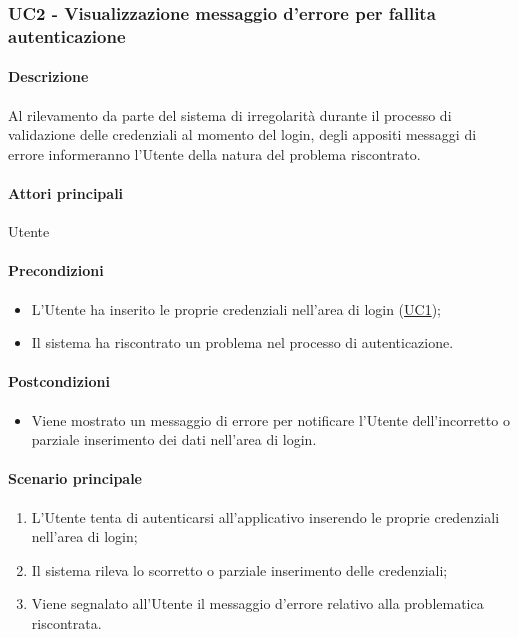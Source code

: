 \subsubsection{UC2 - Visualizzazione messaggio d'errore per fallita autenticazione}\label{UC2}
\paragraph*{Descrizione}
Al rilevamento da parte del sistema di irregolarità durante il processo di validazione delle credenziali al momento del login, degli appositi messaggi di errore informeranno l’Utente della natura del problema riscontrato.

\paragraph*{Attori principali}
Utente

\paragraph*{Precondizioni}
\begin{itemize}
  \item L’Utente ha inserito le proprie credenziali nell’area di login (\hyperref[UC1]{UC1});
  \item Il sistema ha riscontrato un problema nel processo di autenticazione.  
\end{itemize}

\paragraph*{Postcondizioni}
\begin{itemize}
  \item Viene mostrato un messaggio di errore per notificare l’Utente dell’incorretto o parziale inserimento dei dati nell’area di login.
\end{itemize}

\paragraph*{Scenario principale}
\begin{enumerate}
  \item L’Utente tenta di autenticarsi all’applicativo inserendo le proprie credenziali nell’area di login;
  \item Il sistema rileva lo scorretto o parziale inserimento delle credenziali;
  \item Viene segnalato all’Utente il messaggio d’errore relativo alla problematica riscontrata.  
\end{enumerate}

